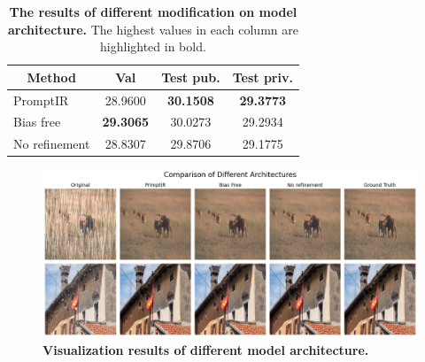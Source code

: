 \documentclass[10pt,twocolumn,letterpaper]{article}
\begin{document}
\begin{table}[h]
  \centering
  \begin{tabular}{lccc}
    \toprule
    \multicolumn{1}{c}{\textbf{Method}} & \textbf{Val}     & \textbf{Test pub.} & \textbf{Test priv.} \\
    \midrule
    PromptIR                            & 28.9600          & \textbf{30.1508}    & \textbf{29.3773}   \\
    Bias free                           & \textbf{29.3065} & 30.0273             & 29.2934            \\
    No refinement                       & 28.8307          & 29.8706             & 29.1775            \\
    \bottomrule
  \end{tabular}
  \caption{\textbf{The results of different modification on model architecture.}
    The highest values in each column are highlighted in bold.}
  \label{tab:arch}
\end{table}

\begin{figure}[h]
  \centering
  \includegraphics[width=1\linewidth]{assets/exp-arch.png}
  \caption{\textbf{Visualization results of different model architecture.}}
  \label{fig:arch}
\end{figure}


{\small


}
\end{document}
